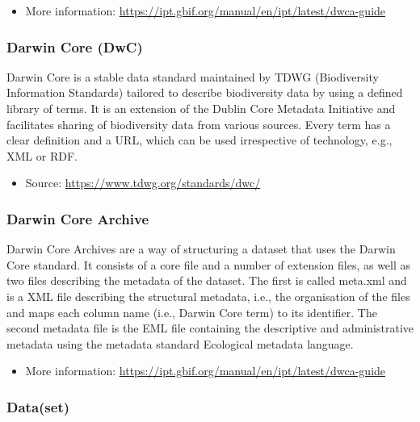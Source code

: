 \documentclass[
]{book}
\providecommand{\tightlist}{%
  \setlength{\itemsep}{0pt}\setlength{\parskip}{0pt}}
\begin{document}
\begin{itemize}
\tightlist
\item
  More information: \url{https://ipt.gbif.org/manual/en/ipt/latest/dwca-guide}
\end{itemize}

\hypertarget{DwC}{%
\subsubsection*{Darwin Core (DwC)}\label{DwC}}

Darwin Core is a stable data standard maintained by TDWG (Biodiversity Information Standards) tailored to describe biodiversity data by using a defined library of terms. It is an extension of the Dublin Core Metadata Initiative and facilitates sharing of biodiversity data from various sources. Every term has a clear definition and a URL, which can be used irrespective of technology, e.g., XML or RDF.

\begin{itemize}
\tightlist
\item
  Source: \url{https://www.tdwg.org/standards/dwc/}
\end{itemize}

\hypertarget{DwC-A}{%
\subsubsection*{Darwin Core Archive}\label{DwC-A}}

Darwin Core Archives are a way of structuring a dataset that uses the Darwin Core standard. It consists of a core file and a number of extension files, as well as two files describing the metadata of the dataset. The first is called meta.xml and is a XML file describing the structural metadata, i.e., the organisation of the files and maps each column name (i.e., Darwin Core term) to its identifier. The second metadata file is the EML file containing the descriptive and administrative metadata using the metadata standard Ecological metadata language.

\begin{itemize}
\tightlist
\item
  More information: \url{https://ipt.gbif.org/manual/en/ipt/latest/dwca-guide}
\end{itemize}

\hypertarget{dataset}{%
\subsubsection*{Data(set)}\label{dataset}}
\end{document}
